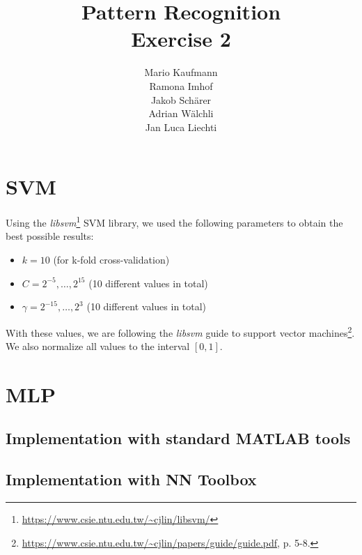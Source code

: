 \documentclass[a4paper]{article}
\title{Pattern Recognition\\Exercise 2}
\author{Mario Kaufmann \\ Ramona Imhof \\ Jakob Sch\"arer \\ Adrian W\"alchli \\ Jan Luca Liechti}
\begin{document}
\maketitle

\section{SVM}
Using the \textit{libsvm}\footnote{\url{https://www.csie.ntu.edu.tw/~cjlin/libsvm/}} SVM library, we used the following parameters to obtain the best possible results:
\begin{itemize}
\item $k = 10$ (for k-fold cross-validation)
\item $C = 2^{-5}, \ldots, 2^{15}$ (10 different values in total)
\item $\gamma = 2^{-15}, \ldots, 2^{3}$ (10 different values in total)
\end{itemize}
With these values, we are following the \textit{libsvm} guide to support vector machines\footnote{\url{https://www.csie.ntu.edu.tw/~cjlin/papers/guide/guide.pdf}, p. 5-8.}. We also normalize all values to the interval $[0,1]$.

\section{MLP}

\subsection{Implementation with standard MATLAB tools}

\subsection{Implementation with NN Toolbox}
%
%
%
%




\end{document}
